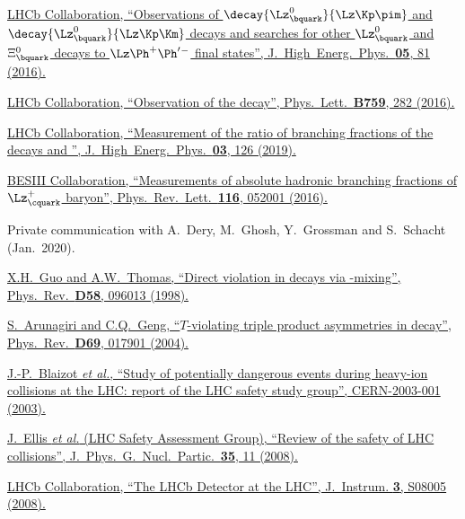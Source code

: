 \href{https://doi.org/10.1007/JHEP05(2016)081}{LHCb Collaboration, \enquote{Observations of $\decay{\Lz^0_\bquark}{\Lz\Kp\pim}$ and $\decay{\Lz^0_\bquark}{\Lz\Kp\Km}$ decays and searches for other $\Lz^0_\bquark$ and $\Xi^0_\bquark$ decays to $\Lz\Ph^+\Ph'{}^-$ final states}, J.\ High\ Energ.\ Phys.\ \textbf{05}, 81 (2016).}

\href{https://doi.org/10.1016/j.physletb.2016.05.077}{LHCb Collaboration, \enquote{Observation of the  decay}, Phys.\ Lett.\ \textbf{B759}, 282 (2016).}

\href{https://doi.org/10.1007/JHEP03(2019)126}{LHCb Collaboration, \enquote{Measurement of the ratio of branching fractions of the decays  and }, J.\ High\ Energ.\ Phys.\ \textbf{03}, 126 (2019).}

\href{https://doi.org/10.1103/PhysRevLett.116.052001}{BESIII Collaboration, \enquote{Measurements of absolute hadronic branching fractions of $\Lz^+_\cquark$ baryon}, Phys.\ Rev.\ Lett.\ \textbf{116}, 052001 (2016).}

Private communication with A.~Dery, M.~Ghosh, Y.~Grossman and S.~Schacht (Jan.~2020).

\href{https://doi.org/10.1103/PhysRevD.58.096013}{X.H.~Guo and A.W.~Thomas, \enquote{Direct \CP violation in \decay{\Lb}{\neutron(\Lz)\pip\pim} decays via \Prho-\Pomega mixing}, Phys.\ Rev.\ \textbf{D58}, 096013 (1998).}

\href{https://doi.org/10.1103/PhysRevD.69.017901}{S.~Arunagiri and C.Q.~Geng, \enquote{$T$-violating triple product asymmetries in \decay{\Lb}{\Lz\pip\pim} decay}, Phys.\ Rev.\ \textbf{D69}, 017901 (2004).}

\href{https://doi.org/10.5170/CERN-2003-001}{J.-P.~Blaizot \textit{et al.}, \enquote{Study of potentially dangerous events during heavy-ion collisions at the LHC: report of the LHC safety study group}, CERN-2003-001 (2003).}

\href{https://doi.org/10.1088/0954-3899/35/11/115004}{J.~Ellis \textit{et al.} (LHC Safety Assessment Group), \enquote{Review of the safety of LHC collisions}, J.\ Phys.\ G.\ Nucl.\ Partic.\ \textbf{35}, 11 (2008).}

\href{https://doi.org/10.1088/1748-0221/3/08/s08005}{LHCb Collaboration, \enquote{The LHCb Detector at the LHC}, J.\ Instrum. \textbf{3}, S08005 (2008).}

